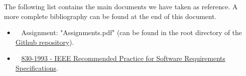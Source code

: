 The following list contains the main documents we have taken as reference. A more complete bibliography can be found at the end of this document.

\begin{itemize}
\item~ Assignment: "Assignments.pdf" (can be found in the root directory of the \href{https://github.com/TommasoBianchi/BettiBianchi_SWENG2}{Github repository}).
\item~ \href{http://ieeexplore.ieee.org/document/392555/}{830-1993 - IEEE Recommended Practice for Software Requirements Specifications}.
\end{itemize}